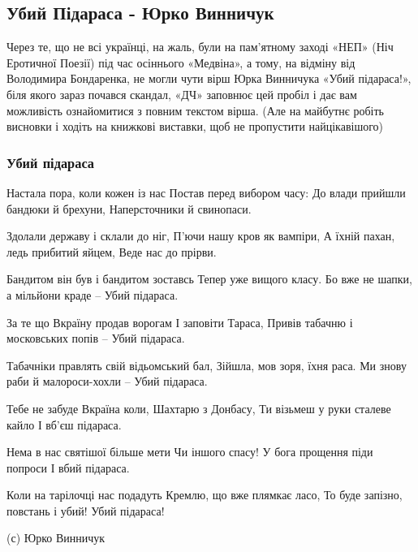  
 
 

\subsection{Убий Підараса - Юрко Винничук}

Через те, що не всі українці, на жаль, були на пам’ятному заході «НЕП» (Ніч
Еротичної Поезії) під час осіннього «Медвіна», а тому, на відміну від
Володимира Бондаренка, не могли чути вірш Юрка Винничука «Убий підараса!», біля
якого зараз почався скандал, «ДЧ» заповнює цей пробіл і дає вам можливість
ознайомитися з повним текстом вірша. (Але на майбутнє робіть висновки і ходіть
на книжкові виставки, щоб не пропустити найцікавішого)

\subsubsection{Убий підараса}

Настала пора, коли кожен із нас
Постав перед вибором часу:
До влади прийшли бандюки й брехуни,
Наперсточники й свинопаси.

Здолали державу і склали до ніг,
П’ючи нашу кров як вампіри,
А їхній пахан, ледь прибитий яйцем,
Веде нас до прірви.

Бандитом він був і бандитом зоставсь
Тепер уже вищого класу.
Бо вже не шапки, а мільйони краде –
Убий підараса.

За те що Вкраїну продав ворогам
І заповіти Тараса,
Привів табачню і московських попів –
Убий підараса.

Табачніки правлять свій відьомський бал,
Зійшла, мов зоря, їхня раса.
Ми знову раби й малороси-хохли –
Убий підараса.

Тебе не забуде Вкраїна коли,
Шахтарю з Донбасу,
Ти візьмеш у руки сталеве кайло
І вб’єш підараса.

Нема в нас святішої більше мети
Чи іншого спасу!
У бога прощення піди попроси
І вбий підараса.

Коли на тарілочці нас подадуть
Кремлю, що вже плямкає ласо,
То буде запізно, повстань і убий!
Убий підараса!

(с) Юрко Винничук
